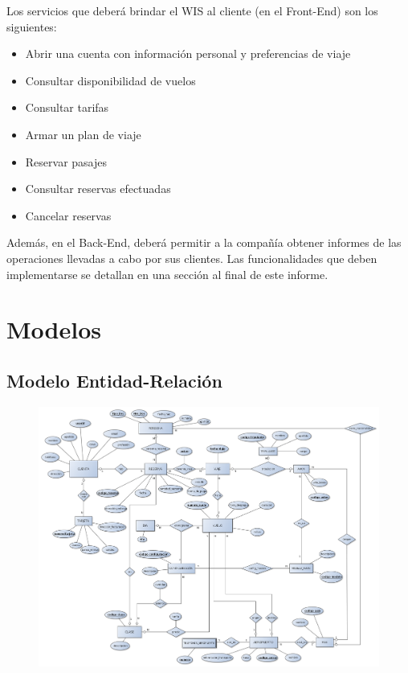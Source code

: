 \documentclass[a4paper,10pt]{article}
\begin{document}
Los servicios que deberá brindar el WIS al cliente (en el Front-End) son los
siguientes:
\begin{itemize}
\item Abrir una cuenta con información personal y preferencias de viaje
\item Consultar disponibilidad de vuelos
\item Consultar tarifas
\item Armar un plan de viaje
\item Reservar pasajes
\item Consultar reservas efectuadas
\item Cancelar reservas
\end{itemize}

 
 Además, en el Back-End, deberá permitir a la compañía obtener informes de las operaciones llevadas a
cabo por sus clientes. Las funcionalidades que deben implementarse se detallan en una sección al final de este informe.


 \newpage

\section{Modelos}

\subsection{Modelo Entidad-Relaci\'on}



\begin{figure}[h!]
\centering
    \includegraphics[angle=90, scale=.38]{DER.png}
\end{figure}
\end{document}
